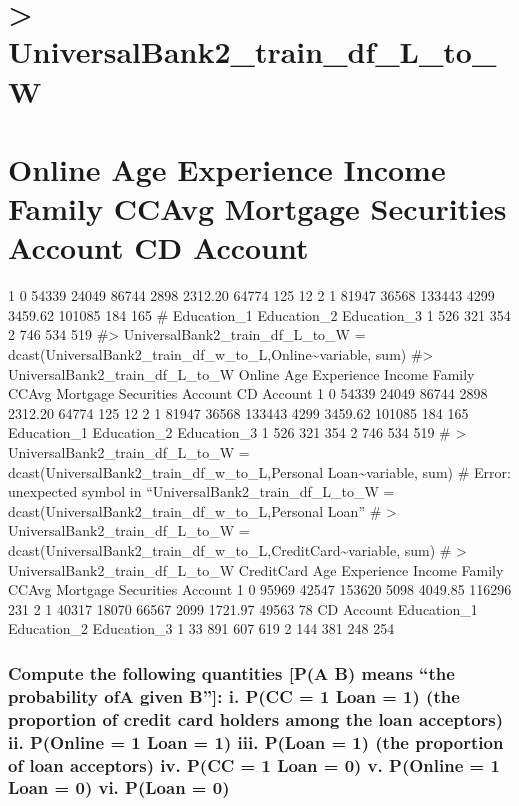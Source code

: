 \documentclass[
]{article}
\begin{document}
\hypertarget{universalbank2_train_df_l_to_w-1}{%
\section{\textgreater{}
UniversalBank2\_train\_df\_L\_to\_W}\label{universalbank2_train_df_l_to_w-1}}

\hypertarget{online-age-experience-income-family-ccavg-mortgage-securities-account-cd-account}{%
\section{Online Age Experience Income Family CCAvg Mortgage Securities
Account CD
Account}\label{online-age-experience-income-family-ccavg-mortgage-securities-account-cd-account}}

1 0 54339 24049 86744 2898 2312.20 64774 125 12 2 1 81947 36568 133443
4299 3459.62 101085 184 165 \# Education\_1 Education\_2 Education\_3 1
526 321 354 2 746 534 519 \#\textgreater{}
UniversalBank2\_train\_df\_L\_to\_W =
dcast(UniversalBank2\_train\_df\_w\_to\_L,Online\textasciitilde variable,
sum) \#\textgreater{} UniversalBank2\_train\_df\_L\_to\_W Online Age
Experience Income Family CCAvg Mortgage Securities Account CD Account 1
0 54339 24049 86744 2898 2312.20 64774 125 12 2 1 81947 36568 133443
4299 3459.62 101085 184 165 Education\_1 Education\_2 Education\_3 1 526
321 354 2 746 534 519 \# \textgreater{}
UniversalBank2\_train\_df\_L\_to\_W =
dcast(UniversalBank2\_train\_df\_w\_to\_L,Personal
Loan\textasciitilde variable, sum) \# Error: unexpected symbol in
``UniversalBank2\_train\_df\_L\_to\_W =
dcast(UniversalBank2\_train\_df\_w\_to\_L,Personal Loan'' \#
\textgreater{} UniversalBank2\_train\_df\_L\_to\_W =
dcast(UniversalBank2\_train\_df\_w\_to\_L,CreditCard\textasciitilde variable,
sum) \# \textgreater{} UniversalBank2\_train\_df\_L\_to\_W CreditCard
Age Experience Income Family CCAvg Mortgage Securities Account 1 0 95969
42547 153620 5098 4049.85 116296 231 2 1 40317 18070 66567 2099 1721.97
49563 78 CD Account Education\_1 Education\_2 Education\_3 1 33 891 607
619 2 144 381 248 254

\hypertarget{compute-the-following-quantities-pa-b-means-the-probability-ofa-given-b-i.-pcc-1-loan-1-the-proportion-of-credit-card-holders-among-the-loan-acceptors-ii.-ponline-1-loan-1-iii.-ploan-1-the-proportion-of-loan-acceptors-iv.-pcc-1-loan-0-v.-ponline-1-loan-0-vi.-ploan-0}{%
\subsubsection{Compute the following quantities {[}P(A \textbar{} B)
means ``the probability ofA given B''{]}: i. P(CC = 1 \textbar{} Loan =
1) (the proportion of credit card holders among the loan acceptors) ii.
P(Online = 1 \textbar{} Loan = 1) iii. P(Loan = 1) (the proportion of
loan acceptors) iv. P(CC = 1 \textbar{} Loan = 0) v. P(Online = 1
\textbar{} Loan = 0) vi. P(Loan =
0)}\label{compute-the-following-quantities-pa-b-means-the-probability-ofa-given-b-i.-pcc-1-loan-1-the-proportion-of-credit-card-holders-among-the-loan-acceptors-ii.-ponline-1-loan-1-iii.-ploan-1-the-proportion-of-loan-acceptors-iv.-pcc-1-loan-0-v.-ponline-1-loan-0-vi.-ploan-0}}
\end{document}
